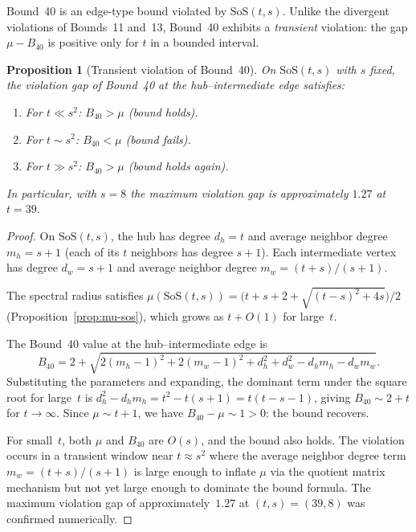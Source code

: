 \documentclass[preprint,12pt]{elsarticle}
\newtheorem{proposition}[theorem]{Proposition}
\theoremstyle{definition}
\theoremstyle{remark}
\newcommand{\SoS}{\mathrm{SoS}}       %
\newcommand{\Lspec}{\mu}               %
\begin{document}
Bound~40 is an edge-type bound violated by $\SoS(t, s)$.  Unlike the
divergent violations of Bounds~11 and~13, Bound~40 exhibits a
\emph{transient} violation: the gap $\Lspec - B_{40}$ is positive
only for $t$ in a bounded interval.

\begin{proposition}[Transient violation of Bound~40]\label{prop:bound40-transient}
  On $\SoS(t, s)$ with $s$ fixed, the violation gap of Bound~40 at the
  hub--intermediate edge satisfies:
  \begin{enumerate}[label=\textup{(\alph*)}]
    \item For $t \ll s^2$: $B_{40} > \Lspec$ \textup{(bound holds)}.
    \item For $t \sim s^2$: $B_{40} < \Lspec$ \textup{(bound fails)}.
    \item For $t \gg s^2$: $B_{40} > \Lspec$ \textup{(bound holds again)}.
  \end{enumerate}
  In particular, with $s = 8$ the maximum violation gap is approximately
  $1.27$ at $t = 39$.
\end{proposition}

\begin{proof}
  On $\SoS(t,s)$, the hub has degree $d_h = t$ and average neighbor degree
  $m_h = s + 1$ (each of its $t$ neighbors has degree $s+1$).  Each
  intermediate vertex has degree $d_w = s + 1$ and average neighbor degree
  $m_w = (t + s)/(s+1)$.

  The spectral radius satisfies
  $\Lspec(\SoS(t,s)) = \bigl(t + s + 2 + \sqrt{(t-s)^2 + 4s}\bigr)/2$
  (Proposition~\ref{prop:mu-sos}), which grows as $t + O(1)$ for large~$t$.

  The Bound~40 value at the hub--intermediate edge is
  \[
    B_{40} = 2 + \sqrt{2(m_h{-}1)^2 + 2(m_w{-}1)^2 + d_h^2 + d_w^2 - d_h m_h - d_w m_w}.
  \]
  Substituting the parameters and expanding, the dominant term under the
  square root for large~$t$ is $d_h^2 - d_h m_h = t^2 - t(s{+}1) = t(t{-}s{-}1)$,
  giving $B_{40} \sim 2 + t$ for $t \to \infty$.  Since
  $\Lspec \sim t + 1$, we have $B_{40} - \Lspec \sim 1 > 0$: the bound
  recovers.

  For small~$t$, both $\Lspec$ and $B_{40}$ are $O(s)$, and the bound
  also holds.  The violation occurs in a transient window near
  $t \approx s^2$ where the average neighbor degree term $m_w = (t{+}s)/(s{+}1)$
  is large enough to inflate $\Lspec$ via the quotient matrix mechanism
  but not yet large enough to dominate the bound formula.  The maximum
  violation gap of approximately~$1.27$ at $(t,s) = (39,8)$ was confirmed
  numerically.
\end{proof}
\end{document}
